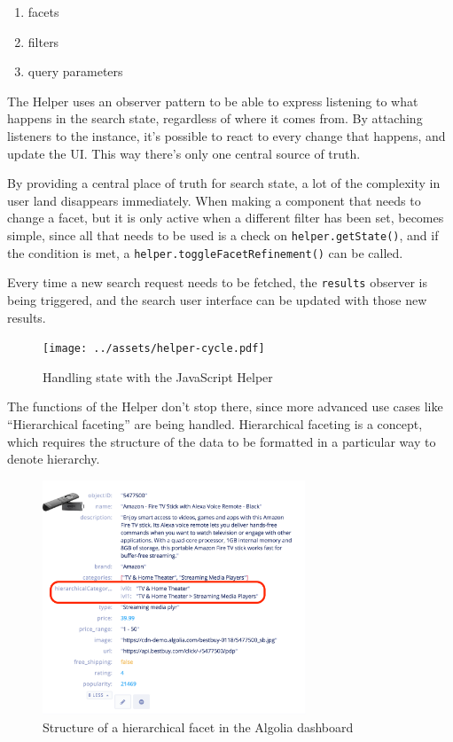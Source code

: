 \begin{enumerate}
  \item facets
  \item filters
  \item query parameters
\end{enumerate}

The Helper uses an observer pattern to be able to express listening to what happens in the search state, regardless of where it comes from. By attaching listeners to the instance, it's possible to react to every change that happens, and update the UI. This way there's only one central source of truth.

By providing a central place of truth for search state, a lot of the complexity in user land disappears immediately. When making a component that needs to change a facet, but it is only active when a different filter has been set, becomes simple, since all that needs to be used is a check on {\tt helper.getState()}, and if the condition is met, a {\tt helper.toggleFacetRefinement()} can be called.

Every time a new search request needs to be fetched, the {\tt results} observer is being triggered, and the search user interface can be updated with those new results.

\begin{figure}[H]
  \centering
  \texttt{[image: ../assets/helper-cycle.pdf]}
  \caption{Handling state with the JavaScript Helper\cite{js-helper-concepts}}
  \label{figure:js-helper-state}
\end{figure}

The functions of the Helper don't stop there, since more advanced use cases like ``Hierarchical faceting''\cite{hierarchical-faceting} are being handled. Hierarchical faceting is a concept, which requires the structure of the data to be formatted in a particular way to denote hierarchy. 

\begin{figure}[H]
  \centering
  \includegraphics[width=0.7\textwidth]{../assets/hierarchical-dashboard.png}
  \caption{Structure of a hierarchical facet in the Algolia dashboard}
  \label{figure:hierarchical-facets}
\end{figure}

